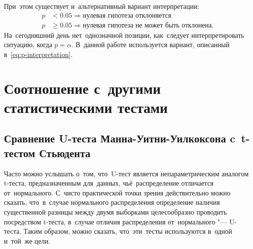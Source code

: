 \documentclass[]{scrreprt}
\begin{document}
%
При~этом существует и~альтернативный вариант интерпретации:
%
\begin{equation}\label{eq:p-interpretation-2}
\begin{aligned}
p &< 0.05 \Rightarrow \text{нулевая гипотеза отклоняется}\\
p &\geq 0.05 \Rightarrow \text{нулевая гипотеза не может быть отклонена}.
\end{aligned}
\end{equation}
На~сегодняшний день нет~однозначной позиции, как~следует интерпретировать ситуацию, когда $p = \alpha$. В~данной работе используется вариант, описанный в~\ref{eq:p-interpretation}.

\section{Соотношение с~другими статистическими тестами}
\subsection{Сравнение U-теста Манна-Уитни-Уилкоксона c~t-тестом Стьюдента}
Часто можно услышать о~том, что~U-тест является непараметрическим аналогом t-теста, предназначенным для~данных, чьё~распределение отличается от~нормального. С~чисто практической точки зрения действительно можно сказать, что~в~случае нормального распределения определение наличия существенной разницы между двумя выборками целесообразно проводить посредством t-теста, в~случае отличия распределения от~нормального "--- U-теста. Таким образом, можно сказать, что~эти~тесты используются в~одной и~той~же цели.
\end{document}
